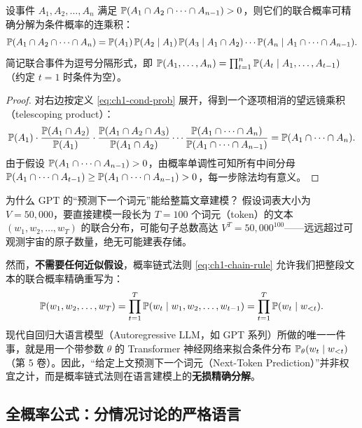 \begin{thmBox}
\begin{theorem}
\label{thm:ch1-chain-rule}
设事件 $A_1, A_2, \dots, A_n$ 满足 $\mathbb{P}(A_1 \cap A_2 \cap \dots \cap A_{n-1}) > 0$，则它们的联合概率可精确分解为条件概率的连乘积：
\begin{equation}
  \mathbb{P}(A_1 \cap A_2 \cap \dots \cap A_n)
  = \mathbb{P}(A_1)\,\mathbb{P}(A_2 \mid A_1)\,\mathbb{P}(A_3 \mid A_1 \cap A_2)\cdots\mathbb{P}(A_n \mid A_1 \cap \dots \cap A_{n-1}).
  \label{eq:ch1-chain-rule}
\end{equation}
简记联合事件为逗号分隔形式，即 $\mathbb{P}(A_1, \dots, A_n) = \prod_{t=1}^n \mathbb{P}(A_t \mid A_1, \dots, A_{t-1})$（约定 $t=1$ 时条件为空）。
\end{theorem}
\end{thmBox}

\begin{proof}
对右边按定义 \eqref{eq:ch1-cond-prob} 展开，得到一个逐项相消的望远镜乘积（telescoping product）：
\[
  \mathbb{P}(A_1)\cdot \frac{\mathbb{P}(A_1 \cap A_2)}{\mathbb{P}(A_1)}\cdot \frac{\mathbb{P}(A_1 \cap A_2 \cap A_3)}{\mathbb{P}(A_1 \cap A_2)}\cdots \frac{\mathbb{P}(A_1 \cap \dots \cap A_n)}{\mathbb{P}(A_1 \cap \dots \cap A_{n-1})}
  = \mathbb{P}(A_1 \cap \dots \cap A_n).
\]
由于假设 $\mathbb{P}(A_1 \cap \dots \cap A_{n-1}) > 0$，由概率单调性可知所有中间分母 $\mathbb{P}(A_1 \cap \dots \cap A_{t-1}) \ge \mathbb{P}(A_1 \cap \dots \cap A_{n-1}) > 0$，每一步除法均有意义。
\end{proof}

\begin{insightBox}{为什么 GPT 的“预测下一个词元”能给整篇文章建模？}
假设词表大小为 $V = 50{,}000$，要直接建模一段长为 $T = 100$ 个词元（token）的文本 $(w_1, w_2, \dots, w_T)$ 的联合分布，可能句子总数高达 $V^T = 50{,}000^{100}$——远远超过可观测宇宙的原子数量，绝无可能建表存储。

然而，\textbf{不需要任何近似假设}，概率链式法则 \eqref{eq:ch1-chain-rule} 允许我们把整段文本的联合概率精确重写为：
\[
  \mathbb{P}(w_1, w_2, \dots, w_T) = \prod_{t=1}^T \mathbb{P}(w_t \mid w_1, w_2, \dots, w_{t-1}) = \prod_{t=1}^T \mathbb{P}(w_t \mid w_{<t}).
\]
现代自回归大语言模型（Autoregressive LLM，如 GPT 系列）所做的唯一一件事，就是用一个带参数 $\theta$ 的 Transformer 神经网络来拟合条件分布 $\mathbb{P}_\theta(w_t \mid w_{<t})$（第 5 卷）。因此，“给定上文预测下一个词元（Next-Token Prediction）”并非权宜之计，而是概率链式法则在语言建模上的\textbf{无损精确分解}。
\end{insightBox}

\subsection{全概率公式：分情况讨论的严格语言}


